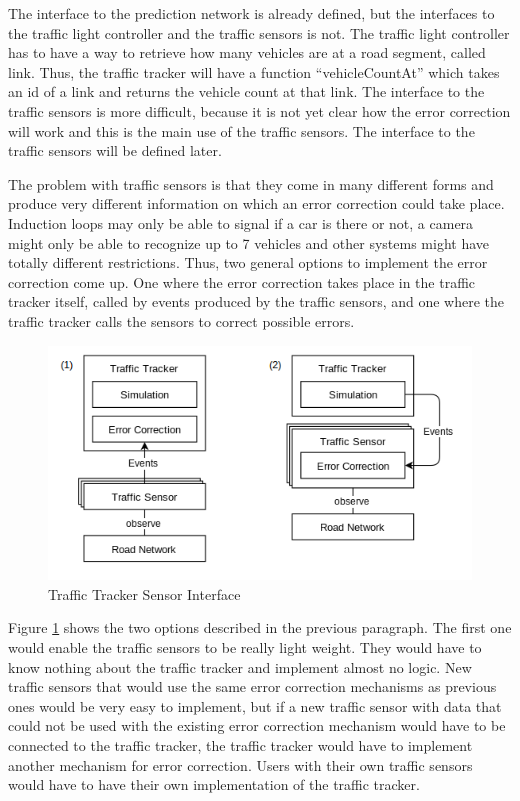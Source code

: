 The interface to the prediction network is already defined, but the interfaces to the traffic light controller and the traffic sensors is not. The traffic light controller has to have a way to retrieve how many vehicles are at a road segment, called link. Thus, the traffic tracker will have a function ``vehicleCountAt'' which takes an id of a link and returns the vehicle count at that link. The interface to the traffic sensors is more difficult, because it is not yet clear how the error correction will work and this is the main use of the traffic sensors. The interface to the traffic sensors will be defined later.

The problem with traffic sensors is that they come in many different forms and produce very different information on which an error correction could take place. Induction loops may only be able to signal if a car is there or not, a camera might only be able to recognize up to 7 vehicles and other systems might have totally different restrictions. Thus, two general options to implement the error correction come up. One where the error correction takes place in the traffic tracker itself, called by events produced by the traffic sensors, and one where the traffic tracker calls the sensors to correct possible errors. 

\begin{figure}[!ht]
  \centering
  \includegraphics[width=16cm]{figures/trackerSensorInterface}
  \caption[Traffic Tracker Sensor Interface]{Traffic Tracker Sensor Interface \protect\footnotemark}
  \label{trafficTrackerSensorInterface}
\end{figure}

Figure \ref{trafficTrackerSensorInterface} shows the two options described in the previous paragraph. The first one would enable the traffic sensors to be really light weight. They would have to know nothing about the traffic tracker and implement almost no logic. New traffic sensors that would use the same error correction mechanisms as previous ones would be very easy to implement, but if a new traffic sensor with data that could not be used with the existing error correction mechanism would have to be connected to the traffic tracker, the traffic tracker would have to implement another mechanism for error correction. Users with their own traffic sensors would have to have their own implementation of the traffic tracker.

